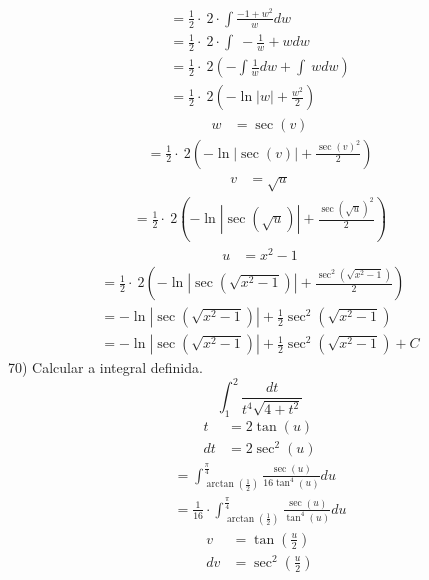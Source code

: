 \documentclass[a4paper,times,12pt]{article}
\begin{document}
\begin{gather*}
	=\frac{1}{2}\cdot \:2\cdot \int \frac{-1+w^2}{w}dw \\
	=\frac{1}{2}\cdot \:2\cdot \int \:-\frac{1}{w}+wdw \\
	=\frac{1}{2}\cdot \:2\left(-\int \frac{1}{w}dw+\int \:wdw\right) \\
	=\frac{1}{2}\cdot \:2\left(-\ln \left|w\right|+\frac{w^2}{2}\right)
\end{gather*}
\begin{align*}
	w&=\sec \left(v\right)
\end{align*}
\begin{gather*}
	=\frac{1}{2}\cdot \:2\left(-\ln \left|\sec \left(v\right)\right|+\frac{\sec \left(v\right)^2}{2}\right)
\end{gather*}
\begin{align*}
	v&=\sqrt{u}
\end{align*}
\begin{gather*}
	=\frac{1}{2}\cdot \:2\left(-\ln \left|\sec \left(\sqrt{u}\right)\right|+\frac{\sec \left(\sqrt{u}\right)^2}{2}\right)
\end{gather*}
\begin{align*}
	u&=x^2-1
\end{align*}
\begin{gather*}
	=\frac{1}{2}\cdot \:2\left(-\ln \left|\sec \left(\sqrt{x^2-1}\right)\right|+\frac{\sec ^2\left(\sqrt{x^2-1}\right)}{2}\right) \\
	=-\ln \left|\sec \left(\sqrt{x^2-1}\right)\right|+\frac{1}{2}\sec ^2\left(\sqrt{x^2-1}\right) \\
	=-\ln \left|\sec \left(\sqrt{x^2-1}\right)\right|+\frac{1}{2}\sec ^2\left(\sqrt{x^2-1}\right)+C
\end{gather*}
\newpage
\hspace*{+15pt} 70) Calcular a integral definida.
\[ \int _1^2\frac{dt}{t^4\sqrt{4+t^2}} \]
\begin{align*}
	t&=2\tan \left(u\right) \\
	dt&=2\sec ^2\left(u\right)
\end{align*}
\begin{gather*}
	=\int _{\arctan \left(\frac{1}{2}\right)}^{\frac{\pi }{4}}\frac{\sec \left(u\right)}{16\tan ^4\left(u\right)}du \\
	=\frac{1}{16}\cdot \int _{\arctan \left(\frac{1}{2}\right)}^{\frac{\pi }{4}}\frac{\sec \left(u\right)}{\tan ^4\left(u\right)}du
\end{gather*}
\begin{align*}
	v&=\tan \left(\frac{u}{2}\right) \\
	dv&=\sec ^2\left(\frac{u}{2}\right)
\end{align*}
\end{document}
